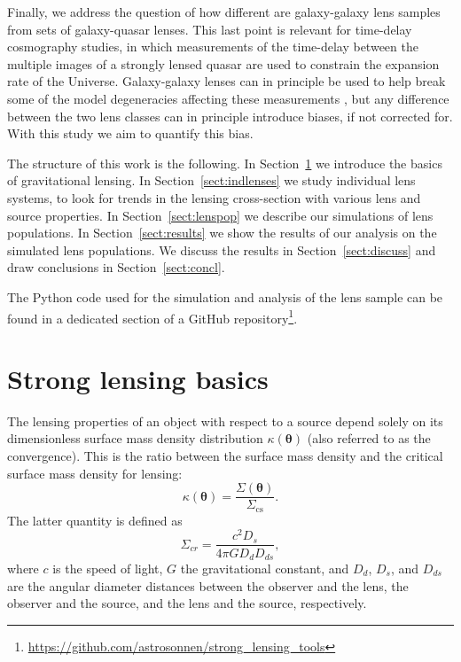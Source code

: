 \documentclass{aa}
\def\Sref#1{Section~\ref{#1}\xspace}
\begin{document}
Finally, we address the question of how different are galaxy-galaxy lens samples from sets of galaxy-quasar lenses. This last point is relevant for time-delay cosmography studies, in which measurements of the time-delay between the multiple images of a strongly lensed quasar are used to constrain the expansion rate of the Universe. Galaxy-galaxy lenses can in principle be used to help break some of the model degeneracies affecting these measurements \citep{B+T21}, but any difference between the two lens classes can in principle introduce biases, if not corrected for.
With this study we aim to quantify this bias.

The structure of this work is the following.
In \Sref{sect:basics} we introduce the basics of gravitational lensing.
In \Sref{sect:indlenses} we study individual lens systems, to look for trends in the lensing cross-section with various lens and source properties.
In \Sref{sect:lenspop} we describe our simulations of lens populations.
In \Sref{sect:results} we show the results of our analysis on the simulated lens populations.
We discuss the results in \Sref{sect:discuss} and draw conclusions in \Sref{sect:concl}.

The Python code used for the simulation and analysis of the lens sample can be found in a dedicated section of a GitHub repository\footnote{\url{https://github.com/astrosonnen/strong_lensing_tools}}.


\section{Strong lensing basics}\label{sect:basics}

The lensing properties of an object with respect to a source depend solely on its dimensionless surface mass density distribution $\kappa(\boldsymbol\theta)$ (also referred to as the convergence). 
This is the ratio between the surface mass density and the critical surface mass density for lensing:
\begin{equation}
\kappa(\boldsymbol\theta) = \dfrac{\Sigma(\boldsymbol\theta)}{\Sigma_{\mathrm{cs}}}.
\end{equation}
The latter quantity is defined as
\begin{equation}
\Sigma_{cr} = \dfrac{c^2D_s}{4\pi G D_d D_{ds}},
\end{equation}
where $c$ is the speed of light, $G$ the gravitational constant, and $D_d$, $D_s$, and $D_{ds}$ are the angular diameter distances between the observer and the lens, the observer and the source, and the lens and the source, respectively.
\end{document}
